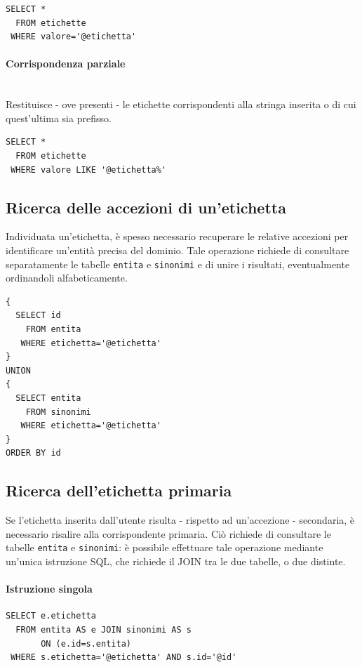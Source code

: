 \documentclass[10pt,a4paper,headinclude,footinclude,hidelinks]{scrreprt} %
\begin{document}
\begin{verbatim}
SELECT *
  FROM etichette
 WHERE valore='@etichetta'
\end{verbatim}

	\paragraph{Corrispondenza parziale} \hfill \\
	Restituisce - ove presenti - le etichette corrispondenti alla stringa inserita o di cui quest'ultima sia prefisso.

\begin{verbatim}
SELECT *
  FROM etichette	
 WHERE valore LIKE '@etichetta%'
\end{verbatim}

	\subsection{Ricerca delle accezioni di un'etichetta}
	\label{ch:stage:er:operazioni:etichette:accezioni}
	Individuata un'etichetta, è spesso necessario recuperare le relative accezioni per identificare un'entità precisa del dominio. Tale operazione richiede di consultare separatamente le tabelle \texttt{entita} e \texttt{sinonimi} e di unire i risultati, eventualmente ordinandoli alfabeticamente.

\begin{verbatim}
{
  SELECT id
    FROM entita	
   WHERE etichetta='@etichetta'
}
UNION
{
  SELECT entita
    FROM sinonimi	
   WHERE etichetta='@etichetta'
}
ORDER BY id
\end{verbatim}

	\subsection{Ricerca dell'etichetta primaria}
	\label{ch:stage:er:operazioni:etichette:ricerca-primaria}
	Se l'etichetta inserita dall'utente risulta - rispetto ad un'accezione - secondaria, è necessario risalire alla corrispondente primaria. Ciò richiede di consultare le tabelle \texttt{entita} e \texttt{sinonimi}: è possibile effettuare tale operazione mediante un'unica istruzione SQL, che richiede il JOIN tra le due tabelle, o due distinte.

\paragraph{Istruzione singola}
\begin{verbatim}
SELECT e.etichetta
  FROM entita AS e JOIN sinonimi AS s
       ON (e.id=s.entita)
 WHERE s.etichetta='@etichetta' AND s.id='@id'
\end{verbatim}
\end{document}
